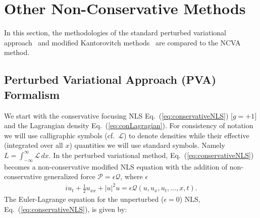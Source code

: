 \section{Other Non-Conservative Methods}
In this section, the methodologies of the standard perturbed variational approach~\cite{nonlinsc} and modified Kantorovitch methods~\cite{Cerda, Skarka:06, Skarka:10,Skarka:14} are compared to the NCVA method.

\subsection{Perturbed Variational Approach (PVA) Formalism} \label{sec:PVA}

We start with the conservative focusing NLS Eq.~(\ref{eq:conservativeNLS}) [$g = +1]$ and the Lagrangian density Eq.~(\ref{eq:conLagragian}).
%
For consistency of notation we will use calligraphic symbols (cf.~$\mathcal{L}$)
to denote densities while their effective (integrated over all $x$) quantities
we will use standard symbols. Namely ${L} = \int_{-\infty}^{\infty} {\mathcal{L}}\,dx$.
%
In the perturbed variational method, Eq.~(\ref{eq:conservativeNLS}) becomes a non-conservative modified NLS equation with the addition of non-conservative generalized force $\mathcal{P} = \epsilon \mathcal{Q}$, where $\epsilon$ %
\begin{align}
iu_t + \frac{1}{2} u_{xx} + |u|^2 u = \epsilon \mathcal{Q}(u,u_x, u_t,\ldots,x,t). 
\label{eq:nonCNLS}
\end{align}
The Euler-Lagrange equation for the unperturbed ($\epsilon = 0$) NLS, Eq.~(\ref{eq:conservativeNLS}), is given by:

